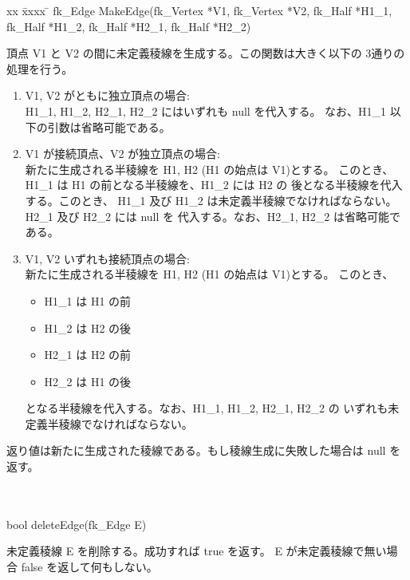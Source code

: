 \newpage
\begin{tabbing}
xx \= xxxx \= \kill
 \> fk\_Edge MakeEdge(fk\_Vertex *V1, fk\_Vertex *V2, fk\_Half *H1\_1, fk\_Half *H1\_2,
	fk\_Half *H2\_1, fk\_Half *H2\_2) \\
	\> \> \begin{minipage}[]{15cm}
		頂点 V1 と V2 の間に未定義稜線を生成する。この関数は大きく以下の
		3通りの処理を行う。

		\begin{enumerate}
		 \item V1, V2 がともに独立頂点の場合: \\
			H1\_1, H1\_2, H2\_1, H2\_2 にはいずれも null を代入する。
			なお、H1\_1 以下の引数は省略可能である。

		 \item V1 が接続頂点、V2 が独立頂点の場合: \\
			新たに生成される半稜線を H1, H2 (H1 の始点は V1)とする。
	 		このとき、H1\_1 は H1 の前となる半稜線を、H1\_2 には H2 の
			後となる半稜線を代入する。このとき、
			H1\_1 及び H1\_2 は未定義半稜線でなければならない。
			H2\_1 及び H2\_2 には null を
			代入する。なお、H2\_1, H2\_2 は省略可能である。

		 \item V1, V2 いずれも接続頂点の場合: \\
			新たに生成される半稜線を H1, H2 (H1 の始点は V1)とする。
			このとき、
			\begin{itemize}
			 \item H1\_1 は H1 の前
			 \item H1\_2 は H2 の後
			 \item H2\_1 は H2 の前
			 \item H2\_2 は H1 の後
			\end{itemize}
			となる半稜線を代入する。なお、H1\_1, H1\_2, H2\_1, H2\_2 の
			いずれも未定義半稜線でなければならない。
		\end{enumerate}
		返り値は新たに生成された稜線である。もし稜線生成に失敗した場合は
		null を返す。
	\end{minipage} \\ \\
 \> bool deleteEdge(fk\_Edge E) \\
	\> \> \begin{minipage}[]{15cm}
	   	未定義稜線 E を削除する。成功すれば true を返す。
		E が未定義稜線で無い場合 false を返して何もしない。
	\end{minipage}
\end{tabbing}

